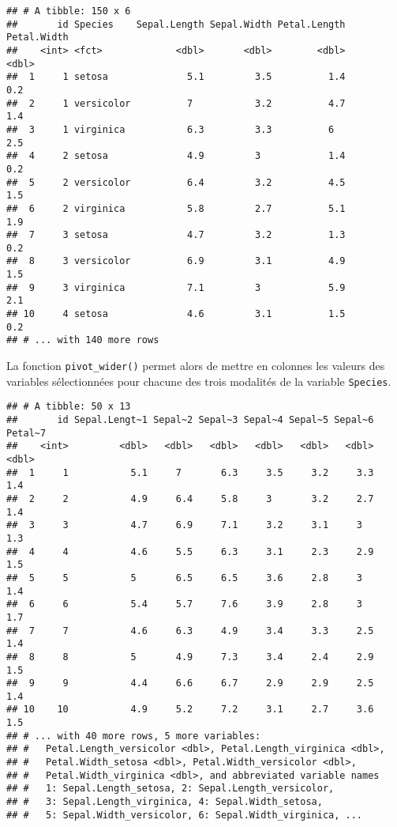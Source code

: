 \documentclass[
  french,
]{book}
\newenvironment{Shaded}{\begin{snugshade}}{\end{snugshade}}
\newcommand{\DataTypeTok}[1]{\textcolor[rgb]{0.13,0.29,0.53}{#1}}
\newcommand{\KeywordTok}[1]{\textcolor[rgb]{0.13,0.29,0.53}{\textbf{#1}}}
\newcommand{\NormalTok}[1]{#1}
\newcommand{\OperatorTok}[1]{\textcolor[rgb]{0.81,0.36,0.00}{\textbf{#1}}}
\newcommand{\StringTok}[1]{\textcolor[rgb]{0.31,0.60,0.02}{#1}}
\begin{document}
\begin{verbatim}
## # A tibble: 150 x 6
##       id Species    Sepal.Length Sepal.Width Petal.Length Petal.Width
##    <int> <fct>             <dbl>       <dbl>        <dbl>       <dbl>
##  1     1 setosa              5.1         3.5          1.4         0.2
##  2     1 versicolor          7           3.2          4.7         1.4
##  3     1 virginica           6.3         3.3          6           2.5
##  4     2 setosa              4.9         3            1.4         0.2
##  5     2 versicolor          6.4         3.2          4.5         1.5
##  6     2 virginica           5.8         2.7          5.1         1.9
##  7     3 setosa              4.7         3.2          1.3         0.2
##  8     3 versicolor          6.9         3.1          4.9         1.5
##  9     3 virginica           7.1         3            5.9         2.1
## 10     4 setosa              4.6         3.1          1.5         0.2
## # ... with 140 more rows
\end{verbatim}

La fonction \texttt{pivot\_wider()} permet alors de mettre en colonnes les valeurs des variables sélectionnées pour chacune des trois modalités de la variable \texttt{Species}.

\begin{Shaded}
\end{Shaded}

\begin{verbatim}
## # A tibble: 50 x 13
##       id Sepal.Lengt~1 Sepal~2 Sepal~3 Sepal~4 Sepal~5 Sepal~6 Petal~7
##    <int>         <dbl>   <dbl>   <dbl>   <dbl>   <dbl>   <dbl>   <dbl>
##  1     1           5.1     7       6.3     3.5     3.2     3.3     1.4
##  2     2           4.9     6.4     5.8     3       3.2     2.7     1.4
##  3     3           4.7     6.9     7.1     3.2     3.1     3       1.3
##  4     4           4.6     5.5     6.3     3.1     2.3     2.9     1.5
##  5     5           5       6.5     6.5     3.6     2.8     3       1.4
##  6     6           5.4     5.7     7.6     3.9     2.8     3       1.7
##  7     7           4.6     6.3     4.9     3.4     3.3     2.5     1.4
##  8     8           5       4.9     7.3     3.4     2.4     2.9     1.5
##  9     9           4.4     6.6     6.7     2.9     2.9     2.5     1.4
## 10    10           4.9     5.2     7.2     3.1     2.7     3.6     1.5
## # ... with 40 more rows, 5 more variables:
## #   Petal.Length_versicolor <dbl>, Petal.Length_virginica <dbl>,
## #   Petal.Width_setosa <dbl>, Petal.Width_versicolor <dbl>,
## #   Petal.Width_virginica <dbl>, and abbreviated variable names
## #   1: Sepal.Length_setosa, 2: Sepal.Length_versicolor,
## #   3: Sepal.Length_virginica, 4: Sepal.Width_setosa,
## #   5: Sepal.Width_versicolor, 6: Sepal.Width_virginica, ...
\end{verbatim}
\end{document}

